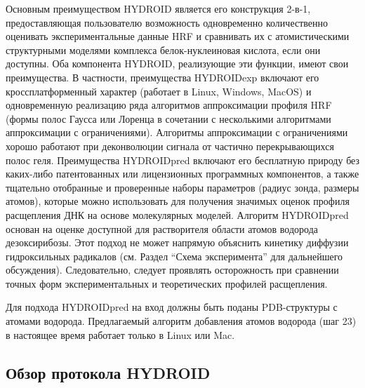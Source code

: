    Основным преимуществом HYDROID является его конструкция 2-в-1, предоставляющая пользователю возможность одновременно количественно оценивать экспериментальные данные HRF и сравнивать их с атомистическими структурными моделями комплекса белок-нуклеиновая кислота, если они доступны. Оба компонента HYDROID, реализующие эти функции, имеют свои преимущества. В частности, преимущества HYDROIDexp включают его кроссплатформенный характер (работает в Linux, Windows, MacOS) и одновременную реализацию ряда алгоритмов аппроксимации профиля HRF (формы полос Гаусса или Лоренца в сочетании с несколькими алгоритмами аппроксимации с ограничениями). Алгоритмы аппроксимации с ограничениями хорошо работают при деконволюции сигнала от частично перекрывающихся полос геля. Преимущества HYDROIDpred включают его бесплатную природу без каких-либо патентованных или лицензионных программных компонентов, а также тщательно отобранные и проверенные наборы параметров (радиус зонда, размеры атомов), которые можно использовать для получения значимых оценок профиля расщепления ДНК на основе молекулярных моделей. Алгоритм HYDROIDpred основан на оценке доступной для растворителя области атомов водорода дезоксирибозы. Этот подход не может напрямую объяснить кинетику диффузии гидроксильных радикалов (см. Раздел ``Схема эксперимента'' для дальнейшего обсуждения). Следовательно, следует проявлять осторожность при сравнении точных форм экспериментальных и теоретических профилей расщепления.

    Для подхода HYDROIDpred на вход должны быть поданы PDB-структуры с атомами водорода. Предлагаемый алгоритм добавления атомов водорода (шаг 23) в настоящее время работает только в Linux или Mac.


\subsection{Обзор протокола HYDROID}

